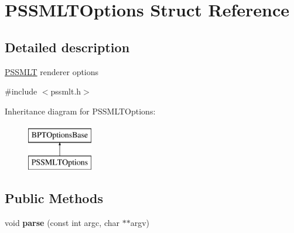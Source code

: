 \hypertarget{struct_p_s_s_m_l_t_options}{}\section{P\+S\+S\+M\+L\+T\+Options Struct Reference}
\label{struct_p_s_s_m_l_t_options}


\subsection{Detailed description}
\hyperlink{struct_p_s_s_m_l_t}{P\+S\+S\+M\+LT} renderer options 

{\ttfamily \#include $<$pssmlt.\+h$>$}

Inheritance diagram for P\+S\+S\+M\+L\+T\+Options\+:\begin{figure}[H]
\begin{center}
\leavevmode
\includegraphics[height=2.000000cm]{struct_p_s_s_m_l_t_options}
\end{center}
\end{figure}
\subsection*{Public Methods}
\begin{DoxyCompactItemize}
\item 
\mbox{\label{struct_p_s_s_m_l_t_options_adc32dd8d8d6ec29b14c3911104ae5f50}} 
void {\bfseries parse} (const int argc, char $\ast$$\ast$argv)
\end{DoxyCompactItemize}
